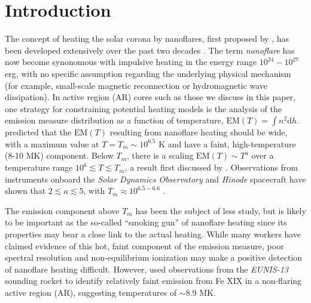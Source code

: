 \documentclass[preprint]{aastex}
\begin{document}
	\section{Introduction}
	\label{sec:intro}
	\par The concept of heating the solar corona by nanoflares, first proposed by \citet{parker_nanoflares_1988}, has been developed extensively over the past two decades \citep[e.g.][]{cargill_implications_1994,cargill_nanoflare_2004,klimchuk_solving_2006}. The term \textit{nanoflare} has now become synonomous with impulsive heating in the energy range $10^{24}-10^{27}$ erg, with no specific assumption regarding the underlying physical mechanism (for example, small-scale magnetic reconnection or hydromagnetic wave dissipation). In active region (AR) cores such as those we discuss in this paper, one strategy for constraining potential heating models is the analysis of the emission measure distribution as a function of temperature, $\mathrm{EM}(T)=\int n^2\mathrm{d}h$. \citet{cargill_implications_1994,cargill_nanoflare_2004} predicted that the $\mathrm{EM}(T)$ resulting from nanoflare heating should be wide, with a maximum value at $T=T_m\sim10^{6.5}$ K and have a faint, high-temperature (8-10 MK) component. Below $T_m$, there is a scaling $\mathrm{EM}(T)\sim T^a$ over a temperature range $10^6\lesssim T\lesssim T_m$, a result first discussed by \citet{jordan_structure_1975}. Observations from instruments onboard the \textit{Solar Dynamics Observatory} \citep[\textit{SDO},][]{pesnell_solar_2012} and \textit{Hinode} spacecraft \citep{kosugi_hinode_2007} have shown that $2\lesssim a\lesssim5$, with $T_m\approx10^{6.5-6.6}$ \citep{tripathi_emission_2011,warren_constraints_2011,warren_systematic_2012,winebarger_using_2011,schmelz_cold_2012,del_zanna_evolution_2015}.
	\par The emission component above $T_m$ has been the subject of less study, but is likely to be important as the so-called ``smoking gun'' of nanoflare heating since its properties may bear a close link to the actual heating. While many workers \citep{reale_evidence_2009,schmelz_hinode_2009,miceli_x-ray_2012,testa_hinode/eis_2012,del_zanna_elemental_2014,petralia_thermal_2014,schmelz_hot_2015} have claimed evidence of this hot, faint component of the emission measure, poor spectral resolution \citep{testa_temperature_2011,winebarger_defining_2012} and non-equilibrium ionization \citep{bradshaw_explosive_2006,reale_nonequilibrium_2008} may make a positive detection of nanoflare heating difficult. However, \citet{brosius_pervasive_2014} used observations from the \textit{EUNIS-13} sounding rocket to identify relatively faint emission from Fe XIX in a non-flaring active region (AR), suggesting temperatures of $\sim8.9$ MK.
\end{document}
